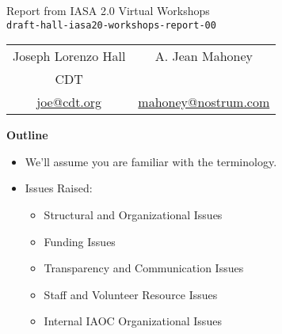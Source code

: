 \documentclass[helvetica]{seminar}
\newcommand{\heading}[1]{%
  \begin{center} 
    \large\bf 
    #1 
  \end{center} 
  \vspace{.4 in}}
\begin{document}
\begin{slide}
\begin{center}
\vspace{.5 in}
\LARGE{{\bf}Report from IASA 2.0 Virtual Workshops\\{\small \verb^draft-hall-iasa20-workshops-report-00^}}\\
\vspace{.2in}
\large{
\begin{tabular}{ c c }
Joseph Lorenzo Hall & A. Jean Mahoney\\
CDT & \\
\url{joe@cdt.org} & \url{mahoney@nostrum.com}
\end{tabular}
}
\end{center}
\end{slide}

\centerslidesfalse 

\begin{slide}
\heading{Outline}

\begin{itemize}
\item We'll assume you are familiar with the terminology.
\item Issues Raised:
  \begin{itemize}
  \item Structural and Organizational Issues
  \item Funding Issues
  \item Transparency and Communication Issues
  \item Staff and Volunteer Resource Issues
  \item Internal IAOC Organizational Issues
  \end{itemize}
\end{itemize}

\end{slide}
\end{document}
